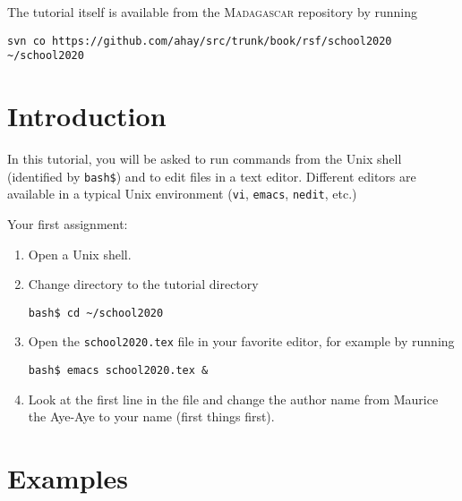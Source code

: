 The tutorial itself is available from the \textsc{Madagascar} repository
by running
\begin{verbatim}
svn co https://github.com/ahay/src/trunk/book/rsf/school2020 ~/school2020
\end{verbatim}
\section{Introduction}

In this tutorial, you will be asked to run commands from the Unix
shell (identified by \texttt{bash\$}) and to edit files in a text
editor. Different editors are available in a typical Unix environment
(\texttt{vi}, \texttt{emacs}, \texttt{nedit}, etc.)

Your first assignment:
\begin{enumerate}
\item Open a Unix shell.
\item Change directory to the tutorial directory
\begin{verbatim}
bash$ cd ~/school2020
\end{verbatim}
\item Open the \texttt{school2020.tex} file in your favorite editor,
  for example by running
\begin{verbatim}
bash$ emacs school2020.tex & 
\end{verbatim}
\item Look at the first line in the file and change the author name
  from Maurice the Aye-Aye to your name (first things first).
\end{enumerate}

\section{Examples}
